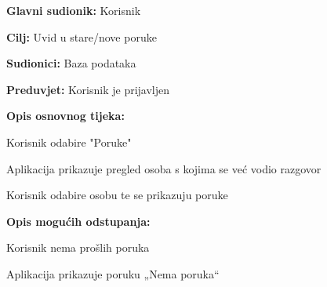 				\noindent {}
				\begin{packed_item}

					\item \textbf{Glavni sudionik: }Korisnik
					\item  \textbf{Cilj:} Uvid u stare/nove poruke
					\item  \textbf{Sudionici:} Baza podataka
					\item  \textbf{Preduvjet:} Korisnik je prijavljen
					\item  \textbf{Opis osnovnog tijeka:}
					
					\item[] \begin{packed_enum}

							\item Korisnik odabire "Poruke"
							\item Aplikacija prikazuje pregled osoba s kojima se već vodio razgovor
							\item Korisnik odabire osobu te se prikazuju poruke
					\end{packed_enum}
				
					\item  \textbf{Opis mogućih odstupanja:}
				
					\item[] \begin{packed_item}

						\item[2.a] Korisnik nema prošlih poruka
						\item[] \begin{packed_enum}
							\item Aplikacija prikazuje poruku „Nema poruka“
						\end{packed_enum}
					\end{packed_item}
				\end{packed_item}

